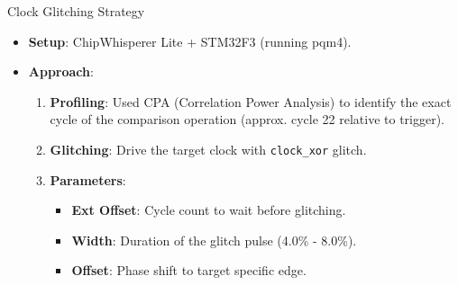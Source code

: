 \documentclass[aspectratio=169]{beamer}
\begin{document}
\begin{frame}{Clock Glitching Strategy}
    \begin{itemize}
        \item \textbf{Setup}: ChipWhisperer Lite + STM32F3 (running pqm4).
        \item \textbf{Approach}:
            \begin{enumerate}
                \item \textbf{Profiling}: Used CPA (Correlation Power Analysis) to identify the exact cycle of the comparison operation (approx. cycle 22 relative to trigger).
                \item \textbf{Glitching}: Drive the target clock with \texttt{clock\_xor} glitch.
                \item \textbf{Parameters}:
                    \begin{itemize}
                        \item \textbf{Ext Offset}: Cycle count to wait before glitching.
                        \item \textbf{Width}: Duration of the glitch pulse (4.0\% - 8.0\%).
                        \item \textbf{Offset}: Phase shift to target specific edge.
                    \end{itemize}
            \end{enumerate}
    \end{itemize}
\end{frame}
\end{document}
